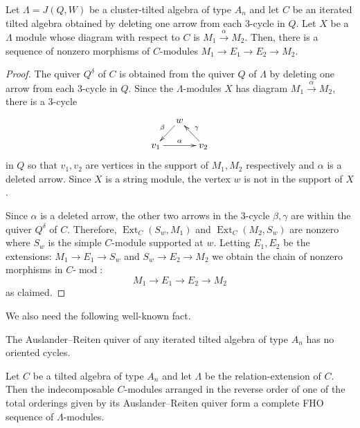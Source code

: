 \documentclass[ALCO,ThmDefs,Unicode,epreuves]{cedram}
\DeclareMathOperator{\Ext}{Ext}%
\DeclareMathOperator{\modr}{mod}
\begin{document}
\begin{lemm}\label{lem: arrow in diagram gives path in C-mod}
Let $\Lambda=J(Q,W)$ be a cluster-tilted algebra of type $A_n$ and let $C$ be an iterated tilted algebra obtained by deleting one arrow from each 3-cycle in $Q$. Let $X$ be a $\Lambda$ module whose diagram with respect to $C$ is $M_1\xrightarrow\alpha M_2$. Then, there is a sequence of nonzero morphisms of $C$-modules $M_1\to E_1\to E_2\to M_2$.
\end{lemm}


\begin{proof} The quiver $Q^\delta$ of $C$ is obtained from the quiver $Q$ of $\Lambda$ by deleting one arrow from each 3-cycle in $Q$. Since the $\Lambda$-modules $X$ has diagram $M_1\xrightarrow\alpha M_2$, there is a 3-cycle
\[
\xymatrixrowsep{15pt}\xymatrixcolsep{10pt}
\xymatrix{%
& w\ar[dl]_\beta\\
v_1\ar[rr]^\alpha &&v_2\ar[lu]_\gamma
	}%
\]
in $Q$ so that $v_1,v_2$ are vertices in the support of $M_1,M_2$ respectively and $\alpha$ is a deleted arrow. Since $X$ is a string module, the vertex $w$ is not in the support of $X$.

Since $\alpha$ is a deleted arrow, the other two arrows in the 3-cycle $\beta,\gamma$ are within the quiver $Q^\delta$ of $C$. Therefore, $\Ext_{C}(S_w,M_1)$ and $\Ext_{C}(M_2,S_w)$ are nonzero where $S_w$ is the simple $C$-module supported at $w$. Letting $E_1,E_2$ be the extensions: $M_1\to E_1\to S_w$ and $S_w\to E_2\to M_2$ we obtain the chain of nonzero morphisms in $C\text{-}\modr $:
\[
	M_1\to E_1\to E_2\to M_2
\]
as claimed.
\end{proof}

We also need the following well-known fact.

\begin{lemm}[\cite{AH}]\label{lem: AR of C is simply-connected}
The Auslander--Reiten quiver of any iterated tilted algebra of type $A_n$ has no oriented cycles.
\end{lemm}


\begin{theo}\label{thm: MSG for An}
Let $C$ be a tilted algebra of type $A_n$ and let $\Lambda$ be the relation-extension of $C$. Then the indecomposable $C$-modules arranged in the reverse order of one of the total orderings given by its Auslander--Reiten quiver form a complete FHO sequence of $\Lambda$-modules.
\end{theo}
\end{document}
